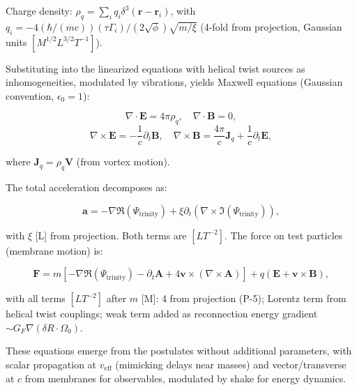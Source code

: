 Charge density: $\rho_q = \sum_i q_i \delta^3(\mathbf{r} - \mathbf{r}_i)$, with $q_i = -4 (\hbar / (m c)) (\tau \Gamma_i) / (2 \sqrt{\phi}) \sqrt{m / \xi}$ (4-fold from projection, Gaussian units $[M^{1/2} L^{3/2} T^{-1}]$).

Substituting into the linearized equations with helical twist sources as inhomogeneities, modulated by vibrations, yields Maxwell equations (Gaussian convention, $\epsilon_0 = 1$):

\begin{equation}
\nabla \cdot \mathbf{E} = 4\pi \rho_q, \quad \nabla \cdot \mathbf{B} = 0,
\end{equation}
\begin{equation}
\nabla \times \mathbf{E} = -\frac{1}{c} \partial_t \mathbf{B}, \quad \nabla \times \mathbf{B} = \frac{4\pi}{c} \mathbf{J}_q + \frac{1}{c} \partial_t \mathbf{E},
\end{equation}

where $\mathbf{J}_q = \rho_q \mathbf{V}$ (from vortex motion).

The total acceleration decomposes as:

\begin{equation}
\mathbf{a} = -\nabla \Re(\Psi_{\text{trinity}}) + \xi \partial_t (\nabla \times \Im(\Psi_{\text{trinity}})),
\end{equation}

with $\xi$ [L] from projection. Both terms are $[L T^{-2}]$. The force on test particles (membrane motion) is:

\begin{equation}
\mathbf{F} = m \left[ -\nabla \Re(\Psi_{\text{trinity}}) - \partial_t \mathbf{A} + 4 \mathbf{v} \times (\nabla \times \mathbf{A}) \right] + q \left( \mathbf{E} + \mathbf{v} \times \mathbf{B} \right),
\end{equation}

with all terms $[L T^{-2}]$ after $m$ [M]: 4 from projection (P-5); Lorentz term from helical twist couplings; weak term added as reconnection energy gradient $\sim G_F \nabla (\delta R \cdot \Omega_0)$.

These equations emerge from the postulates without additional parameters, with scalar propagation at $v_{\text{eff}}$ (mimicking delays near masses) and vector/transverse at $c$ from membranes for observables, modulated by shake for energy dynamics.

